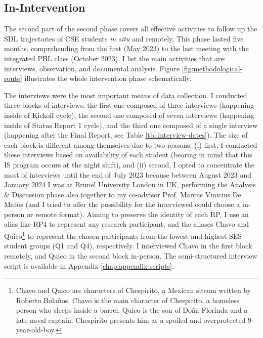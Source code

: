         


\subsection{In-Intervention}
\label{phd-route-ss:in-int}

The second part of the second phase covers all effective activities to follow up the \gls{SDL} trajectories of \gls{CSE} students \textit{in situ} and remotely. This phase lasted five months, comprehending from the first (May 2023) to the last meeting with the integrated \gls{PBL} class (October 2023). I list the main activities that are: interviews, observation, and documental analysis. Figure \ref{fig:methodological-route} illustrates the whole intervention phase schematically. 

The interviews were the most important means of data collection. I conducted three blocks of interviews: the first one composed of three interviews (happening inside of Kickoff cycle), the second one composed of seven interviews (happening inside of Status Report 1 cycle), and the third one composed of a single interview (happening after the Final Report, see Table \ref{tbl:interview-dates}). The size of each block is different among themselves due to two reasons: (i) first, I conducted these interviews based on availability of each student (bearing in mind that this \gls{IS} program occurs at the night shift), and (ii) second, I opted to concentrate the most of interviews until the end of July 2023 because between August 2023 and January 2024 I was at Brunel University London in \gls{UK}, performing the Analysis \& Discussion phase also together to my co-advisor Prof. Marcus Vinicius De Matos (and I tried to offer the possibility for the interviewed could choose a in-person or remote format). Aiming to preserve the identity of each \gls{RP}, I use an alias like \gls{RP}4 to represent any research participant, and the aliases Chavo and Quico\footnote{Chavo and Quico are characters of Chespirito, a Mexican sitcom written by Roberto Bolaños. Chavo is the main character of Chespirito, a homeless person who sleeps inside a barrel. Quico is the son of Doña Florinda and a late naval captain. Chespirito presents him as a spoiled and overprotected 9-year-old-boy.} to represent the chosen participants from the lowest and highest \gls{SES} student groups (\gls{Q}1 and \gls{Q}4), respectively. I interviewed Chavo in the first block remotely, and Quico in the second block in-person. The semi-structured interview script is available in Appendix \ref{chap:appendix-scripts}.

